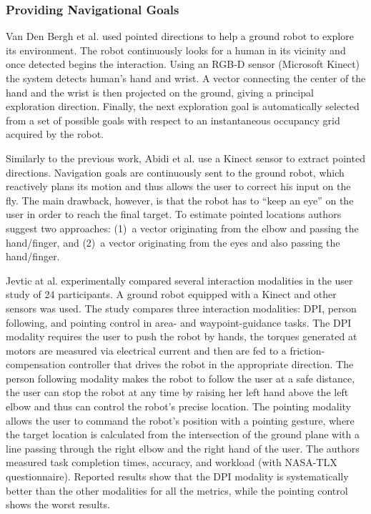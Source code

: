 \subsubsection*{Providing Navigational Goals}
Van Den Bergh et al. \cite{VanDenBergh2011} used pointed directions to help a ground robot to explore its environment. The robot continuously looks for a human in its vicinity and once detected begins the interaction. Using an \acs{RGB-D} sensor (Microsoft Kinect) the system detects human's hand and wrist. A vector connecting the center of the hand and the wrist is then projected on the ground, giving a principal exploration direction. Finally, the next exploration goal is automatically selected from a set of possible goals with respect to an instantaneous occupancy grid acquired by the robot. 

Similarly to the previous work, Abidi et al. \cite{Abidi2013} use a Kinect sensor to extract pointed directions. Navigation goals are continuously sent to the ground robot, which reactively plans its motion and thus allows the user to correct his input on the fly. The main drawback, however, is that the robot has to ``keep an eye'' on the user in order to reach the final target. To estimate pointed locations authors suggest two approaches: (1)~a vector originating from the elbow and passing the hand/finger, and (2)~a vector originating from the eyes and also passing the hand/finger.

Jevtic at al. \cite{Jevtic2015} experimentally compared several interaction modalities in the user study of 24 participants. A ground robot equipped with a Kinect and other sensors was used. The study compares three interaction modalities: \ac{DPI}, person following, and pointing control in area- and waypoint-guidance tasks. The DPI modality requires the user to push the robot by hands, the torques generated at motors are measured via electrical current and then are fed to a friction-compensation controller that drives the robot in the appropriate direction. The person following modality makes the robot to follow the user at a safe distance, the user can stop the robot at any time by raising her left hand above the left elbow and thus can control the robot's precise location. The pointing modality allows the user to command the robot's position with a pointing gesture, where the target location is calculated from the intersection of the ground plane with a line passing through the right elbow and the right hand of the user.
The authors measured task completion times, accuracy, and workload (with NASA-TLX questionnaire). Reported results show that the DPI modality is systematically better than the other modalities for all the metrics, while the pointing control shows the worst results.

